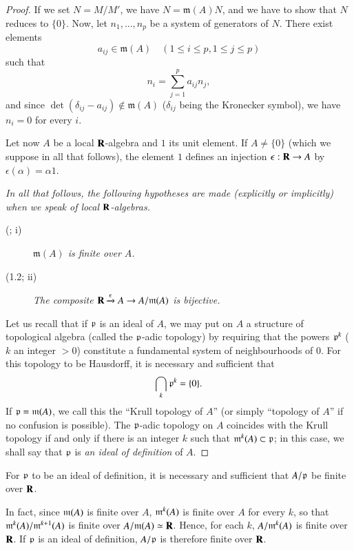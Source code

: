 \begin{proof}
If we set $N=M/M'$, we have $N=\mathfrak{m}(A)N$, and we have to show that $N$ reduces to $\{0\}$. Now, let $n_{1},\ldots,n_{p}$ be a system of generators of $N$. There exist elements
$$
a_{ij}\in \mathfrak{m}(A)\quad (1\leq i\leq p, 1\leq j\leq p)
$$
such that
$$
n_{i}=\sum\limits^{p}_{j=1}a_{ij}n_{j},
$$
and since $\det (\delta_{ij}-a_{ij})\not\in \mathfrak{m}(A)$ ($\delta_{ij}$ being the Kronecker symbol), we have $n_{i}=0$ for every $i$.

Let now $A$ be a local $\mathbf{R}$-algebra and $1$ its unit element. If $A\neq \{0\}$ (which we suppose in all that follows), the element $1$ defines an injection $\epsilon:\mathbf{R}\to A$ by $\epsilon(\alpha)=\alpha 1$.

{\em In all that follows, the following hypotheses are made (explicitly or implicitly) when we speak of local $\mathbf{R}$-algebras.}
\begin{description}
\item[(;\label{chap3-id1.2} i)] {\em $\mathfrak{m}(A)$ is finite over $A$.}

\item[(1.2; ii)] {\em The composite $\mathbf{R}\xrightarrow{\epsilon}A\to A/\mathfrak{m}(A)$ is bijective.}
\end{description}

Let us recall that if $\mathfrak{p}$ is an ideal of $A$, we may put on $A$ a structure of topological algebra (called the $\mathfrak{p}$-adic topology) by requiring that the powers $\mathfrak{p}^{k}$ ($k$ an integer $>0$) constitute a fundamental system of neighbourhoods of $0$. For this topology to be Hausdorff, it is necessary and sufficient that
$$
\bigcap\limits_{k}\mathfrak{p}^{k}=\{0\}.
$$
If $\mathfrak{p}=\mathfrak{m}(A)$, we call this the ``Krull topology of $A$'' (or simply ``topology of $A$'' if no confusion is possible). The $\mathfrak{p}$-adic topology on $A$ coincides with the Krull topology if and only if there is an integer $k$ such that $\mathfrak{m}^{k}(A)\subset \mathfrak{p}$; in this case, we shall say that $\mathfrak{p}$ is {\em an ideal of definition} of $A$.
\end{proof}

\setcounter{theorem}{2}
\begin{proposition}\label{chap2-prop1.3}
For $\mathfrak{p}$ to be an ideal of definition, it is necessary and sufficient that $A/\mathfrak{p}$ be finite over $\mathbf{R}$.
\end{proposition}

In fact, since $\mathfrak{m}(A)$ is finite over $A$, $\mathfrak{m}^{k}(A)$ is finite over $A$ for every $k$, so that $\mathfrak{m}^{k}(A)/\mathfrak{m}^{k+1}(A)$ is finite over $A/\mathfrak{m}(A)\simeq \mathbf{R}$. Hence, for each $k$, $A/\mathfrak{m}^{k}(A)$ is finite over $\mathbf{R}$. If $\mathfrak{p}$ is an ideal of definition, $A/\mathfrak{p}$ is therefore finite over $\mathbf{R}$.

